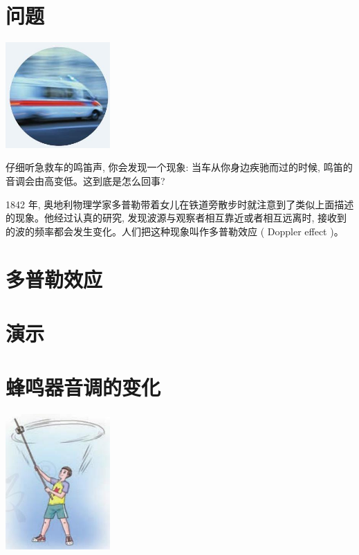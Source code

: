 \documentclass[10pt]{article}
\begin{document}
\section*{问题}

\begin{center}
\includegraphics[max width=0.3\textwidth]{images/01910e4c-ebb8-7d2c-8f2f-2375bc1d2d12_84_750019.jpg}
\end{center}

仔细听急救车的鸣笛声, 你会发现一个现象: 当车从你身边疾驰而过的时候, 鸣笛的音调会由高变低。这到底是怎么回事?

1842 年, 奥地利物理学家多普勒带着女儿在铁道旁散步时就注意到了类似上面描述的现象。他经过认真的研究, 发现波源与观察者相互靠近或者相互远离时, 接收到的波的频率都会发生变化。人们把这种现象叫作多普勒效应 ( Doppler effect )。

\section*{多普勒效应}

\section*{演示}

\section*{蜂鸣器音调的变化}

\begin{center}
\includegraphics[max width=0.3\textwidth]{images/01910e4c-ebb8-7d2c-8f2f-2375bc1d2d12_84_658542.jpg}
\end{center}
\end{document}
